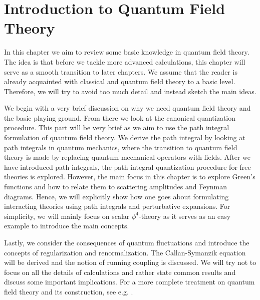 \chapter{Introduction to Quantum Field Theory}\label{chap:Intro QFT}
In this chapter we aim to review some basic knowledge in quantum field theory. The idea is that before we tackle more advanced calculations, this chapter will serve as a smooth transition to later chapters. We assume that the reader is already acquainted with classical and quantum field theory to a basic level. Therefore, we will try to avoid too much detail and instead sketch the main ideas. 

We begin with a very brief discussion on why we need quantum field theory and the basic playing ground. From there we look at the canonical quantization procedure. This part will be very brief as we aim to use the path integral formulation of quantum field theory. We derive the path integral by looking at path integrals in quantum mechanics, where the transition to quantum field theory is made by replacing quantum mechanical operators with fields. After we have introduced path integrals, the path integral quantization procedure for free theories is explored. However, the main focus in this chapter is to explore Green's functions and how to relate them to scattering amplitudes and Feynman diagrams. Hence, we will explicitly show how one goes about formulating interacting theories using path integrals and perturbative expansions. For simplicity, we will mainly focus on scalar $\phi
^{4}$-theory as it serves as an easy example to introduce the main concepts. 

Lastly, we consider the consequences of quantum fluctuations and introduce the concepts of regularization and renormalization. The Callan-Symanzik equation will be derived and the notion of running coupling is discussed. We will try not to focus on all the details of calculations and rather state common results and discuss some important implications. For a more complete treatment on quantum field theory and its construction, see e.g. \cite{Peskin:257493,Schwartz:2013pla,Srednicki:2007qs}.




